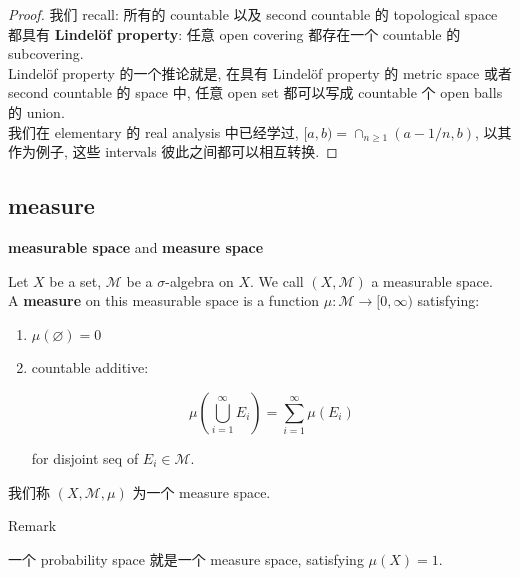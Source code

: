 \documentclass{qlnotes-export}
\begin{document}
\begin{proof}

我们 recall: 所有的 countable 以及 second countable 的 topological space 都具有 \textbf{Lindelöf property}: 任意 open covering 都存在一个 countable 的 subcovering.\\
Lindelöf property 的一个推论就是, 在具有 Lindelöf property 的 metric space 或者 second countable 的 space 中, 任意 open set 都可以写成 countable 个 open balls 的 union.\\
我们在 elementary 的 real analysis 中已经学过, \(\lbrack a,b) = \cap_{n \geq 1}(a - 1/n,b)\), 以其作为例子, 这些 intervals 彼此之间都可以相互转换.

\end{proof}

\subsection{measure}\label{measure}

\begin{definition}{\protect{}\label{kn-measurable-space-and-measure-space}{\textbf{measurable
space}} and
\protect{}\label{kn-measure-space}{\textbf{measure space}}}

Let \(X\) be a set, \(\mathcal{M}\) be a \(\sigma\)-algebra on \(X\). We call \((X,\mathcal{M})\) a measurable space.\\
A \protect{}\label{kn-measure}{\textbf{measure}} on this measurable space is a function \(\mu:\mathcal{M}\rightarrow\lbrack 0,\infty)\) satisfying:

\begin{enumerate}
\item
  \(\mu(\varnothing) = 0\)
\item
  countable additive:

  \[\mu(\bigcup\limits_{i = 1}^{\infty}E_{i}) = \sum\limits_{i = 1}^{\infty}\mu(E_{i})\]

  for disjoint seq of \(E_{i} \in \mathcal{M}\).
\end{enumerate}

我们称 \((X,\mathcal{M},\mu)\) 为一个 measure space.

\end{definition}

\begin{qlremark}{Remark}

一个 probability space 就是一个 measure space, satisfying \(\mu(X) = 1\).

\end{qlremark}
\end{document}
